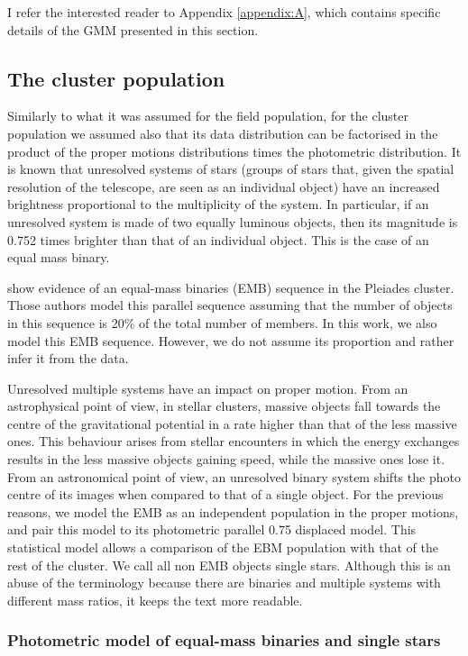 I refer the interested reader to Appendix \ref{appendix:A}, which contains specific details of the GMM presented in this section.

\subsection{The cluster population}
\label{subsect:cluster}
Similarly to what it was assumed for the field population, for the cluster population we assumed also that its data distribution can be factorised in the product of the proper motions distributions times the photometric distribution. It is known that unresolved systems of stars (groups of stars that, given the spatial resolution of the telescope, are seen as an individual object) have an increased brightness proportional to the multiplicity of the system. In particular, if an unresolved system is made of two equally luminous objects, then its magnitude is 0.752 times brighter than that of an individual object. This is the case of an equal mass binary.

\citet{Sarro2014} show evidence of an equal-mass binaries (EMB) sequence in the Pleiades cluster. Those authors model this parallel sequence assuming that the number of objects in this sequence is 20\% of the total number of members. In this work, we also model this EMB sequence. However, we do not assume its proportion and rather infer it from the data. 

Unresolved multiple systems have an impact on proper motion. From an astrophysical point of view, in stellar clusters, massive objects fall towards the centre of the gravitational potential in a rate higher than that of the less massive ones. This behaviour arises from stellar encounters in which the energy exchanges results in the less massive objects gaining speed, while the massive ones lose it. From an astronomical point of view, an unresolved binary system shifts the photo centre of its images when compared to that of a single object. For the previous reasons, we model the EMB as an independent population in the proper motions, and pair this model to its photometric parallel 0.75 displaced model. This statistical model allows a comparison of the EBM population with that of the rest of the cluster. We call all non EMB objects single stars. Although this is an abuse of the terminology because there are binaries and multiple systems with different mass ratios, it keeps the text more readable.

\subsubsection{Photometric model of equal-mass binaries and single stars}

